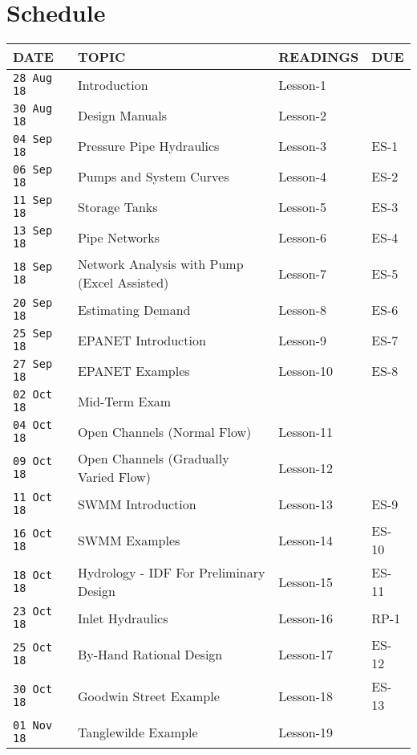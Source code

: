 \documentclass[12pt]{article}
\begin{document}
\section*{Schedule}
\begin{center}
\begin{table}[ht!]
   \begin{tabular}{| p{0.8in} | p{3.4in} | p{1.0in} | p{1.0in} |} 
\hline
\hline
DATE & TOPIC & READINGS & DUE \\
\hline
\hline
\texttt{28 Aug 18} & Introduction & Lesson-1 &  \\
\texttt{30 Aug 18} & Design Manuals & Lesson-2 &  \\
\texttt{04 Sep 18} & Pressure Pipe Hydraulics & Lesson-3 & ES-1 \\
\texttt{06 Sep 18} & Pumps and System Curves & Lesson-4 & ES-2 \\
\texttt{11 Sep 18} & Storage Tanks & Lesson-5 & ES-3 \\
\texttt{13 Sep 18} & Pipe Networks & Lesson-6 & ES-4 \\
\texttt{18 Sep 18} & Network Analysis with Pump (Excel Assisted) & Lesson-7 & ES-5 \\
\texttt{20 Sep 18} & Estimating Demand & Lesson-8 & ES-6 \\
\texttt{25 Sep 18} & EPANET Introduction & Lesson-9 & ES-7 \\
\texttt{27 Sep 18} & EPANET Examples & Lesson-10 & ES-8 \\
\hline
\hline
\texttt{02 Oct 18} & Mid-Term Exam &  &  \\
\hline
\hline
\texttt{04 Oct 18} & Open Channels (Normal Flow) & Lesson-11 &  \\
\texttt{09 Oct 18} & Open Channels (Gradually Varied Flow) & Lesson-12 &  \\
\texttt{11 Oct 18} & SWMM Introduction & Lesson-13 & ES-9 \\
\texttt{16 Oct 18} & SWMM Examples & Lesson-14 & ES-10 \\
\texttt{18 Oct 18} & Hydrology - IDF For Preliminary Design & Lesson-15 & ES-11 \\
\texttt{23 Oct 18} & Inlet Hydraulics & Lesson-16 & RP-1 \\
\texttt{25 Oct 18} & By-Hand Rational Design & Lesson-17 & ES-12 \\
\texttt{30 Oct 18} & Goodwin Street Example & Lesson-18 & ES-13 \\
\texttt{01 Nov 18} & Tanglewilde Example & Lesson-19 & ~ \\

\end{tabular}
\end{table}
\end{center}
\end{document}
